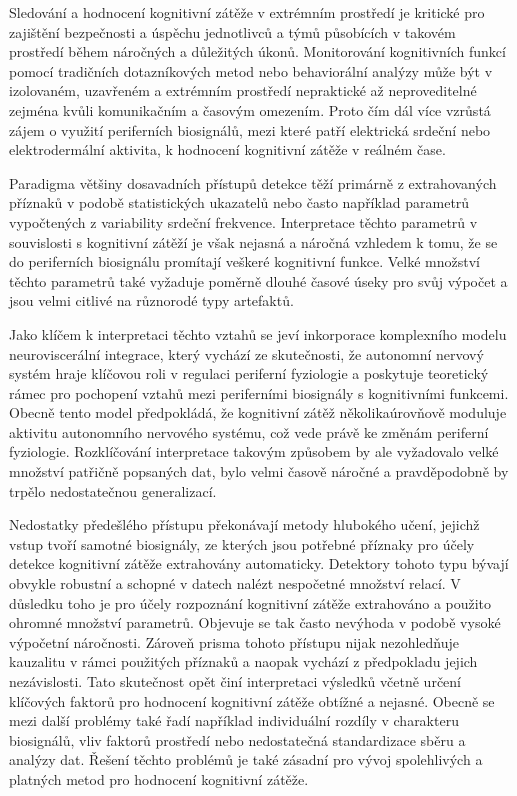 Sledování a hodnocení kognitivní zátěže v extrémním prostředí je kritické pro
zajištění bezpečnosti a úspěchu jednotlivců a týmů působících v takovém
prostředí během náročných a důležitých úkonů. Monitorování kognitivních funkcí
pomocí tradičních dotazníkových metod nebo behaviorální analýzy může být v
izolovaném, uzavřeném a extrémním prostředí nepraktické až neproveditelné
zejména kvůli komunikačním a časovým omezením. Proto čím dál více vzrůstá zájem
o využití periferních biosignálů, mezi které patří elektrická srdeční nebo
elektrodermální aktivita, k hodnocení kognitivní zátěže v reálném čase. 

Paradigma většiny dosavadních přístupů detekce těží primárně z extrahovaných
příznaků v podobě statistických ukazatelů nebo často například parametrů
vypočtených z variability srdeční frekvence. Interpretace těchto parametrů v
souvislosti s kognitivní zátěží je však nejasná a náročná vzhledem k tomu, že se
do periferních biosignálu promítají veškeré kognitivní funkce. Velké množství
těchto parametrů také vyžaduje poměrně dlouhé časové úseky pro svůj výpočet a
jsou velmi citlivé na různorodé typy artefaktů.

Jako klíčem k interpretaci těchto vztahů se jeví inkorporace komplexního modelu
neuroviscerální integrace, který vychází ze skutečnosti, že autonomní nervový
systém hraje klíčovou roli v regulaci periferní fyziologie a poskytuje
teoretický rámec pro pochopení vztahů mezi periferními biosignály s kognitivními
funkcemi. Obecně tento model předpokládá, že kognitivní zátěž několikaúrovňově
moduluje aktivitu autonomního nervového systému, což vede právě ke změnám
periferní fyziologie. Rozklíčování interpretace takovým způsobem by ale
vyžadovalo velké množství patřičně popsaných dat, bylo velmi časově náročné a
pravděpodobně by trpělo nedostatečnou generalizací.

Nedostatky předešlého přístupu překonávají metody hlubokého učení, jejichž vstup
tvoří samotné biosignály, ze kterých jsou potřebné příznaky pro účely detekce
kognitivní zátěže extrahovány automaticky. Detektory tohoto typu bývají obvykle
robustní a schopné v datech nalézt nespočetné množství relací. V důsledku toho
je pro účely rozpoznání kognitivní zátěže extrahováno a použito ohromné množství
parametrů. Objevuje se tak často nevýhoda v podobě vysoké výpočetní náročnosti.
Zároveň prisma tohoto přístupu nijak nezohledňuje kauzalitu v rámci použitých
příznaků a naopak vychází z předpokladu jejich nezávislosti. Tato skutečnost
opět činí interpretaci výsledků včetně určení klíčových faktorů pro hodnocení
kognitivní zátěže obtížné a nejasné. Obecně se mezi další problémy také řadí
například individuální rozdíly v charakteru biosignálů, vliv faktorů prostředí
nebo nedostatečná standardizace sběru a analýzy dat. Řešení těchto problémů je
také zásadní pro vývoj spolehlivých a platných metod pro hodnocení kognitivní
zátěže.


